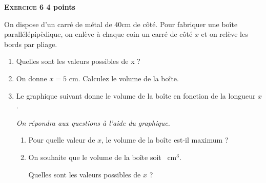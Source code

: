 \textbf{\textsc{Exercice 6} \hfill 4 points}

\medskip
 
On dispose d'un carré de métal de $40$cm de côté. Pour fabriquer une boîte parallélépipèdique, on enlève à chaque coin un carré de côté $x$ et on relève les bords par pliage.

\medskip
 
\begin{enumerate}
\item Quelles sont les valeurs possibles de x ? 
\item On donne $x = 5$ cm. Calculez le volume de la boîte. 
\item Le graphique suivant donne le volume de la boîte en fonction de la longueur $x$.

\emph{On répondra aux questions à l'aide du graphique.} 
	\begin{enumerate}
		\item Pour quelle valeur de $x$, le volume de la boîte est-il maximum ? 
		\item On souhaite que le volume de la boîte soit ~cm$^3$. 
		
Quelles sont les valeurs possibles de $x$ ?
	\end{enumerate} 
\end{enumerate}

